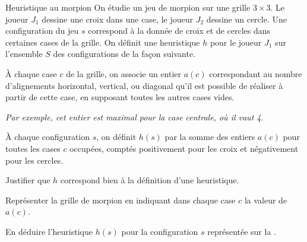 \documentclass[12pt,fancy]{cours}
\begin{document}
\begin{exemple}{Heuristique au morpion}
On étudie un jeu de morpion sur une grille $3 \times 3$. Le joueur $J_1$ dessine une croix dans une case, le joueur $J_2$ dessine un cercle. Une configuration du jeu $s$ correspond à la donnée de croix et de cercles dans certaines cases de la grille.
  On définit une heuristique $h$ pour le joueur $J_1$ sur l'ensemble $S$ des configurations de la façon suivante.
  \begin{liste}
    \item À chaque case $c$ de la grille, on associe un entier $a(c)$ correspondant au nombre d'alignements horizontal, vertical, ou diagonal qu'il est possible de réaliser à partir de cette case, en supposant toutes les autres cases vides.

    \emph{Par exemple, cet entier est maximal pour la case centrale, où il vaut 4}.
    \item À chaque configuration $s$, on définit $h(s)$ par la somme des entiers $a(c)$ pour toutes les cases $c$ occupées, comptés positivement pour les croix et négativement pour les cercles.
  \end{liste}

  \begin{quest}
    \item Justifier que $h$ correspond bien à la définition d'une heuristique.
    \item Représenter la grille de morpion en indiquant dans chaque case $c$ la valeur de $a(c)$.
    \item En déduire l'heuristique $h(s)$ pour la configuration $s$ représentée sur la .
  \end{quest}
  \begin{fig}[morpion]
    \centering
  \end{fig}
\end{exemple}
\end{document}

